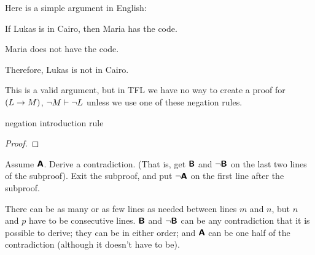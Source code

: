 {{{{{{{{{Here is a simple argument in English:
\begin{earg}
\item If Lukas is in Cairo, then Maria has the code.
\item Maria does not have the code.
\item Therefore, Lukas is not in Cairo.
\end{earg}\label{Cairo}
This is a valid argument, but in TFL we have no way to create a proof for $(L \rightarrow M)$, ${\neg} M \vdash {\neg} L$ unless we use one of these negation rules.

\medskip

\begin{factboxy}{negation introduction rule}
\begin{proof}
\open
	\as{}
\close
{}
\end{proof}

\small{Assume $\bm{\mathsf{A}}$. Derive a contradiction. (That is, get $\bm{\mathsf{B}}$ and ${\neg}\bm{\mathsf{B}}$ on the last two lines of the subproof). Exit the subproof, and put ${\neg}\bm{\mathsf{A}}$ on the first line after the subproof.
\smallskip

There can be as many or as few lines as needed between lines $m$ and $n$, but $n$ and $p$ have to be consecutive lines. $\bm{\mathsf{B}}$ and ${\neg}\bm{\mathsf{B}}$ can be any contradiction that it is possible to derive; they can be in either order; and $\bm{\mathsf{A}}$ can be one half of the contradiction (although it doesn't have to be).}


\end{factboxy}}}}}}}}}}

